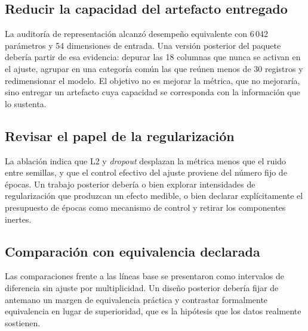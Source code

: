 \subsection{Reducir la capacidad del artefacto entregado}
La auditoría de representación alcanzó desempeño equivalente con 6\,042 parámetros y 54 dimensiones de entrada. Una versión posterior del paquete debería partir de esa evidencia: depurar las 18 columnas que nunca se activan en el ajuste, agrupar en una categoría común las que reúnen menos de 30 registros y redimensionar el modelo. El objetivo no es mejorar la métrica, que no mejoraría, sino entregar un artefacto cuya capacidad se corresponda con la información que lo sustenta.

\subsection{Revisar el papel de la regularización}
La ablación indica que L2 y \emph{dropout} desplazan la métrica menos que el ruido entre semillas, y que el control efectivo del ajuste proviene del número fijo de épocas. Un trabajo posterior debería o bien explorar intensidades de regularización que produzcan un efecto medible, o bien declarar explícitamente el presupuesto de épocas como mecanismo de control y retirar los componentes inertes.

\subsection{Comparación con equivalencia declarada}
Las comparaciones frente a las líneas base se presentaron como intervalos de diferencia sin ajuste por multiplicidad. Un diseño posterior debería fijar de antemano un margen de equivalencia práctica y contrastar formalmente equivalencia en lugar de superioridad, que es la hipótesis que los datos realmente sostienen.
